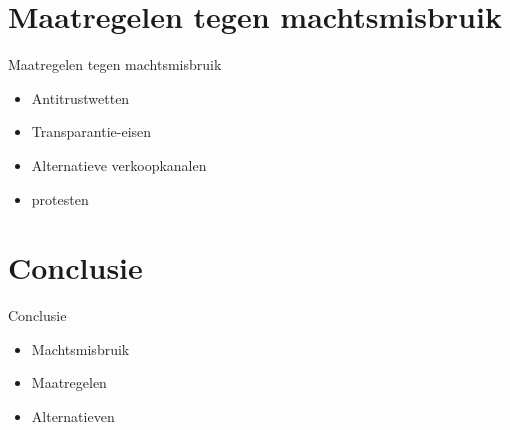 \documentclass{beamer}
\begin{document}
    
\section[Maatregelen tegen machtsmisbruik]{Maatregelen tegen machtsmisbruik}
\begin{frame}{Maatregelen tegen machtsmisbruik}
    \LARGE{
        \begin{itemize}
            \item Antitrustwetten
            \item Transparantie-eisen
            \item Alternatieve verkoopkanalen
            \item protesten
        \end{itemize}
    }
\end{frame}


\section{Conclusie}
\begin{frame}{Conclusie}
    \LARGE{    
        \begin{itemize}
            \item Machtsmisbruik 
            \item Maatregelen
            \item Alternatieven 
        \end{itemize}
    }
\end{frame}
\end{document}
